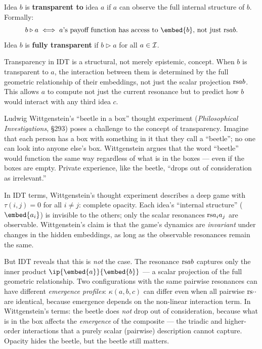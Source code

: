 \begin{definition}[Transparency]
\label{def:transparency}
Idea $b$ is \textbf{transparent to} idea $a$ if $a$ can observe the full
internal structure of $b$.  Formally:
\[
  b \triangleright a \iff \text{$a$'s payoff function has access to
  $\embed{b}$, not just $\rs{a}{b}$}.
\]
Idea $b$ is \textbf{fully transparent} if $b \triangleright a$ for all
$a \in \mathcal{I}$.
\end{definition}

\begin{remark}
Transparency in IDT is a structural, not merely epistemic, concept.  When $b$
is transparent to $a$, the interaction between them is determined by the full
geometric relationship of their embeddings, not just the scalar projection
$\mathrm{rs}{a}{b}$.  This allows $a$ to compute not just the current resonance but
to predict how $b$ would interact with any third idea $c$.
\end{remark}

\begin{interpretation}
\label{interp:ch20:wittgenstein_beetle}
Ludwig Wittgenstein's ``beetle in a box'' thought experiment
(\textit{Philosophical Investigations}, \S293) poses a challenge to the
concept of transparency.  Imagine that each person has a box with something
in it that they call a ``beetle''; no one can look into anyone else's box.
Wittgenstein argues that the word ``beetle'' would function the same way
regardless of what is in the boxes --- even if the boxes are empty.  Private
experience, like the beetle, ``drops out of consideration as irrelevant.''

In IDT terms, Wittgenstein's thought experiment describes a deep game
with $\tau(i,j) = 0$ for all $i \neq j$: complete opacity.  Each idea's
``internal structure'' ($\embed{a_i}$) is invisible to the others; only the
scalar resonances $\mathrm{rs}{a_i}{a_j}$ are observable.  Wittgenstein's claim is
that the game's dynamics are \emph{invariant} under changes in the hidden
embeddings, as long as the observable resonances remain the same.

But IDT reveals that this is \emph{not} the case.  The resonance $\mathrm{rs}{a}{b}$
captures only the inner product $\ip{\embed{a}}{\embed{b}}$ --- a scalar
projection of the full geometric relationship.  Two configurations with
the same pairwise resonances can have different \emph{emergence profiles}:
$\kappa(a, b, c)$ can differ even when all pairwise $\mathrm{rs}{\cdot}{\cdot}$
are identical, because emergence depends on the non-linear interaction
term.  In Wittgenstein's terms: the beetle does \emph{not} drop out of
consideration, because what is in the box affects the \emph{emergence}
of the composite --- the triadic and higher-order interactions that a
purely scalar (pairwise) description cannot capture.  Opacity hides the
beetle, but the beetle still matters.
\end{interpretation}


